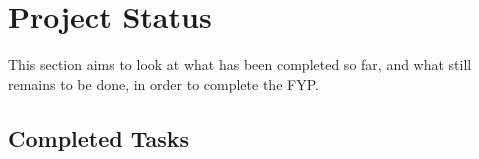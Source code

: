 
\section{Project Status}

This section aims to look at what has been completed so far, and what still remains to be done, in order to complete the FYP.

\subsection{Completed Tasks}

\subsubsection{}
